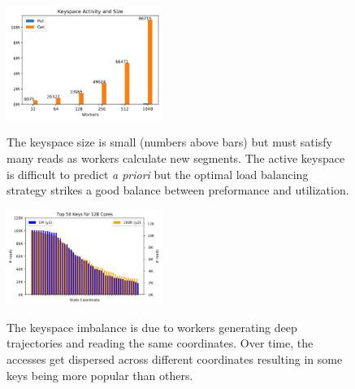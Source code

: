 \begin{figure}[tbh]
  \noindent\includegraphics[width=0.45\textwidth]{figures/methodology-keyspace.png}\\
  \caption{The keyspace size is small (numbers above bars) but must
  satisfy many reads as workers calculate new segments. The active keyspace is
  difficult to predict {\it a priori} but the optimal load balancing strategy strikes a
  good balance between preformance and utilization. 
  \label{fig:methodology-keyspace}}
\end{figure}

\begin{figure}[tbh]
  \noindent\includegraphics[width=0.45\textwidth]{figures/methodology-keys.png}\\
  \caption{The keyspace imbalance is due to workers generating deep
  trajectories and reading the same coordinates. Over time, the accesses get
  dispersed across different coordinates resulting in some keys being more
  popular than others.\label{fig:methodology-keys}}
\end{figure}

